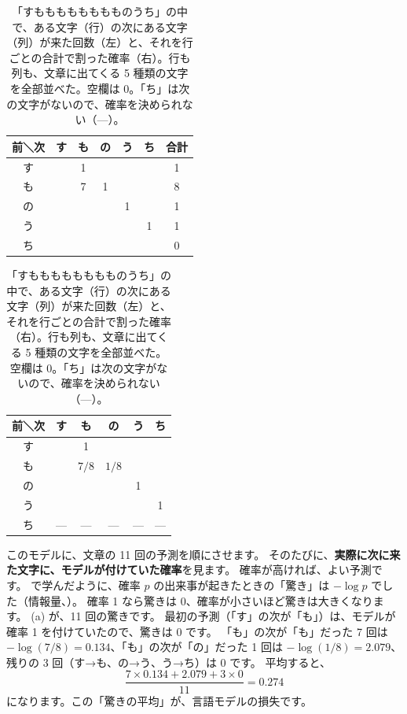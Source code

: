 \begin{table}[htbp]
\centering
\caption{「すもももももももものうち」の中で、ある文字（行）の次にある文字（列）が来た回数（左）と、それを行ごとの合計で割った確率（右）。行も列も、文章に出てくる 5 種類の文字を全部並べた。空欄は 0。「ち」は次の文字がないので、確率を決められない（—）。}
\label{tab:lm-toy}
\small
\begin{tabular}{c|ccccc|c}
\toprule
前＼次 & す & も & の & う & ち & 合計 \\
\midrule
す &  & 1 &  &  &  & 1 \\
も &  & 7 & 1 &  &  & 8 \\
の &  &  &  & 1 &  & 1 \\
う &  &  &  &  & 1 & 1 \\
ち &  &  &  &  &  & 0 \\
\bottomrule
\end{tabular}
\qquad
\begin{tabular}{c|ccccc}
\toprule
前＼次 & す & も & の & う & ち \\
\midrule
す &  & 1 &  &  &  \\
も &  & $7/8$ & $1/8$ &  &  \\
の &  &  &  & 1 &  \\
う &  &  &  &  & 1 \\
ち & — & — & — & — & — \\
\bottomrule
\end{tabular}
\end{table}

このモデルに、文章の 11 回の予測を順にさせます。
そのたびに、\textbf{実際に次に来た文字に、モデルが付けていた確率}を見ます。
確率が高ければ、よい予測です。
で学んだように、確率 $p$ の出来事が起きたときの「驚き」は $-\log p$ でした（情報量、）。
確率 1 なら驚きは 0、確率が小さいほど驚きは大きくなります。
(a) が、11 回の驚きです。
最初の予測（「す」の次が「も」）は、モデルが確率 1 を付けていたので、驚きは 0 です。
「も」の次が「も」だった 7 回は $-\log(7/8)=0.134$、「も」の次が「の」だった 1 回は $-\log(1/8)=2.079$、残りの 3 回（す→も、の→う、う→ち）は 0 です。
平均すると、
\begin{equation*}
\frac{7\times0.134+2.079+3\times0}{11}=0.274
\end{equation*}
になります。この「驚きの平均」が、言語モデルの損失です。

